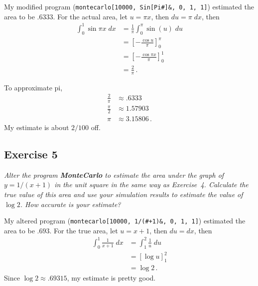 \documentclass{tufte-handout}
\begin{document}
My modified program (\lstinline$montecarlo[10000, Sin[Pi#]&, 0, 1, 1]$)
estimated the area to be $.6333$. For the actual area, let $u = \pi
x$, then $du = \pi \; dx$, then
\begin{align*}
  \int_0^1 \sin \pi x \; dx & = \frac{1}{\pi} \int_0^\pi
  \sin(u) \; du \\
  &= \left[ - \frac{\cos u}{\pi} \right]_0^\pi \\
  &= \left[ - \frac{\cos \pi x}{\pi} \right]_0^1 \\
  &= \frac{2}{\pi} \, .
\end{align*}

To approximate pi,
\begin{align*}
  \frac{2}{\pi} & \approx .6333 \\
  \frac{\pi}{2} & \approx 1.57903 \\
  \pi & \approx 3.15806 \, .
\end{align*}
My estimate is about $2/100$ off.

\subsection{Exercise 5}
\begin{description}
\item \textit{Alter the program \textbf{MonteCarlo} to estimate the
    area under the graph of $y = 1/(x+1)$ in the unit square in the
    same way as Exercise~4. Calculate the true value of this area and
    use your simulation results to estimate the value of
    $\log{2}$. How accurate is your estimate?}
\end{description}

My altered program (\lstinline$montecarlo[10000, 1/(#+1)&, 0, 1, 1]$)
 estimated the area to be $.693$. For the true area, let $u = x +
1$, then $du = dx$, then
\begin{align*}
 \int_0^1 \frac{1}{x+1} \; dx &= \int_1^2 \frac{1}{u} \;
 du \\
 &= \left[ \log{u} \right]_1^2 \\
 &= \log{2} \, .
\end{align*}
Since $\log{2} \approx .69315$, my estimate is pretty good.
\end{document}
